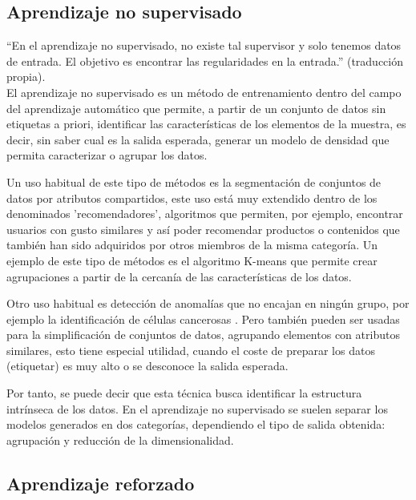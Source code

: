     \subsection{Aprendizaje no supervisado}
    \label{sub:FrameNoSupervisedLearnig}
        
        ``En el aprendizaje no supervisado, no existe tal supervisor y solo tenemos datos de entrada. El objetivo es encontrar las regularidades en la entrada.'' \cite[Pág. 11]{alpaydin2014ML} (traducción propia).\\
        
        El aprendizaje no supervisado es un método de entrenamiento dentro del campo del aprendizaje automático que permite, a partir de un conjunto de datos sin etiquetas a priori, identificar las características de los elementos de la muestra,  es decir, sin saber cual es la salida esperada, generar un modelo de densidad que permita caracterizar o agrupar los datos.
        
        Un uso habitual de este tipo de métodos es la segmentación de conjuntos de datos por atributos compartidos, este uso está muy extendido dentro de los denominados 'recomendadores', algoritmos que permiten, por ejemplo, encontrar usuarios con gusto similares y así poder recomendar productos o contenidos que también han sido adquiridos por otros miembros de la misma categoría. Un ejemplo de este tipo de métodos es el algoritmo K-means que permite crear agrupaciones a partir de la cercanía de las características de los datos.
        
        Otro uso habitual es detección de anomalías que no encajan en ningún grupo, por ejemplo la identificación de células cancerosas \cite{kakushadze2017}. Pero también pueden ser usadas para la simplificación de conjuntos de datos, agrupando elementos con atributos similares, esto tiene especial utilidad, cuando el coste de preparar los datos (etiquetar) es muy alto o se desconoce la salida esperada.
        
        Por tanto, se puede decir que esta técnica busca identificar la estructura intrínseca de los datos. En el aprendizaje no supervisado se suelen separar los modelos generados en dos categorías, dependiendo el tipo de salida obtenida:
        agrupación y reducción de la dimensionalidad.
        
    \subsection{Aprendizaje reforzado}
    \label{sub:FrameReinforcementLearning}
        
